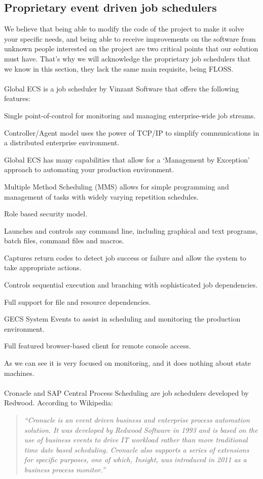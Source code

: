 \subsection{Proprietary event driven job schedulers}
We believe that being able to modify the code of the project to make it solve your specific needs, and being able to receive improvements
on the software from unknown people interested on the project are two critical points that our solution must have. That's why we will 
acknowledge the proprietary job schedulers that we know in this section, they lack the same main requisite, being FLOSS.\\
\\
Global ECS is a job scheduler by Vinzant Software that offers the following features\cite{vin:gecs}:
\begin{list}{-}
    \item Single point-of-control for monitoring and managing enterprise-wide job streams.
    \item Controller/Agent model uses the power of TCP/IP to simplify communications in a distributed enterprise environment.
    \item Global ECS has many capabilities that allow for a ‘Management by Exception’ approach to automating your production environment.
    \item Multiple Method Scheduling (MMS) allows for simple programming and management of tasks with widely varying repetition schedules.
    \item Role based security model.
    \item Launches and controls any command line, including graphical and text programs, batch files, command files and macros.
    \item Captures return codes to detect job success or failure and allow the system to take appropriate actions.
    \item Controls sequential execution and branching with sophisticated job dependencies.
    \item Full support for file and resource dependencies.
    \item GECS System Events to assist in scheduling and monitoring the production environment.
    \item Full featured browser-based client for remote console access.
\end{list}
As we can see it is very focused on monitoring, and it does nothing about state machines.\\
\\
Cronacle and SAP Central Process Scheduling are job schedulers developed by Redwood. According to Wikipedia\cite{wp:rws}:
\begin{quote}
 \emph{	
    ``Cronacle is an event driven business and enterprise process automation solution. It was developed by Redwood Software in 1993 
    and is based on the use of business events to drive IT workload rather than more traditional time date based scheduling. Cronacle 
    also supports a series of extensions for specific purposes, one of which, Insight, was introduced in 2011 as a business process 
    monitor.''
  }
\end{quote}

